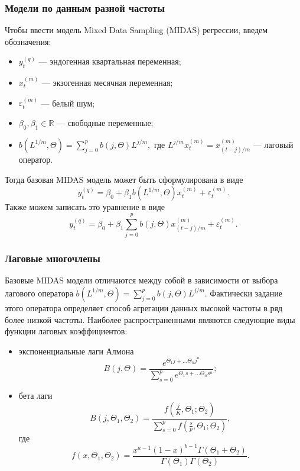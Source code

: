 \documentclass[notheorems, 10pt]{beamer}
\begin{document}
\begin{frame}
	\frametitle{Модели по данным разной частоты}
	Чтобы ввести модель Mixed Data Sampling (MIDAS) регрессии, введем обозначения:
	\begin{itemize}
		\item $y_{t}^{(q)}$ --- эндогенная квартальная переменная;
		\item $x^{(m)}_{t}$ --- экзогенная месячная переменная;
		\item $\varepsilon_t^{(m)}$ --- белый шум;
		\item $\beta_0, \beta_1 \in \mathbb R$ --- свободные переменные;
		\item $b(L^{1/m}, \Theta) = \sum\limits_{j=0}^{p} b(j, \Theta) L^{j/m},$ где $L^{j/m}x_t^{(m)} = x_{(t-j)/m}^{(m)}$ --- лаговый оператор.
	\end{itemize}
	Тогда базовая MIDAS модель может быть сформулирована в виде
	\begin{equation}
		y_t^{(q)} = \beta_0 + \beta_1 b(L^{1/m}, \Theta) x_t^{(m)} + \varepsilon_t^{(m)}.
	\end{equation}
	Также можем записать это уравнение в виде
	\begin{equation}
		y_t^{(q)} = \beta_0 + \beta_1 \sum_{j=0}^{p} b(j,\Theta) x_{(t-j)/m}^{(m)} + \varepsilon_t^{(m)}.
	\end{equation}
\end{frame}
\begin{frame}
	\frametitle{Лаговые многочлены}
	Базовые MIDAS модели отличаются между собой в зависимости от выбора лагового оператора $b(L^{1/m}, \Theta) = \sum\limits_{j=0}^{p} b(j, \Theta) L^{j/m}.$ Фактически задание этого оператора определяет
	способ агрегации данных высокой частоты в ряд более низкой частоты.
	Наиболее распространенными являются следующие виды функции лаговых коэффициентов:
	\begin{itemize}
		\item экспоненциальные лаги Алмона
		\begin{equation}
			B(j, \Theta) = \dfrac{e^{\Theta_1 j + \ldots \Theta_n j^n}}{\sum_{s=0}^{p}e^{\Theta_1 s + \ldots \Theta_n s^n}};
		\end{equation}
		\item бета лаги
		\begin{equation}
			B(j, \Theta_1, \Theta_2) = \dfrac{f(\frac j K, \Theta_1;\Theta_2)}{\sum_{s=0}^{p}f(\frac s p, \Theta_1;\Theta_2)},
		\end{equation}
		где \begin{equation}
			f(x, \Theta_1, \Theta_2) = \dfrac{x^{a-1}(1-x)^{b-1}\Gamma(\Theta_1 + \Theta_2)}{\Gamma(\Theta_1)\Gamma(\Theta_2)}.
		\end{equation}
	\end{itemize}
\end{frame}
\end{document}
